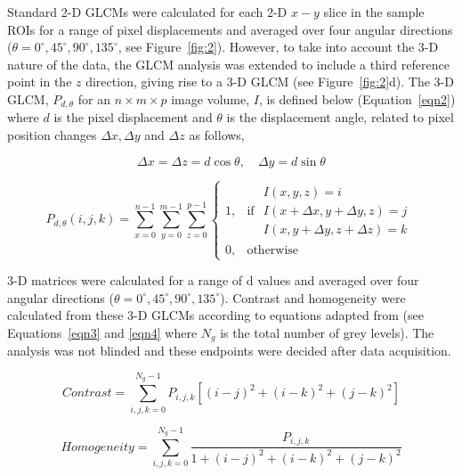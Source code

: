 \documentclass[12pt]{article}
\begin{document}
Standard 2-D GLCMs were calculated for each 2-D $x-y$ slice in the sample ROIs for a range of pixel displacements and averaged over four angular directions ($\theta = 0^{\circ}, 45^{\circ}, 90^{\circ}, 135^{\circ}$, see Figure~\ref{fig:2}). \cite{haralicktextural1973} However, to take into account the 3-D nature of the data, the GLCM analysis was extended to include a third reference point in the $z$ direction, giving rise to a 3-D GLCM (see Figure~\ref{fig:2}d). The 3-D GLCM, $P_{d,\theta}$ for an $n \times m \times p$ image volume, $I$, is defined below (Equation~\ref{eqn2}) where $d$ is the pixel displacement and $\theta$ is the displacement angle, related to pixel position changes $\Delta x, \Delta y$  and $\Delta z$  as follows,   

\begin{equation} \label{eqn1}
\Delta x = \Delta z = d \cos \theta , \quad \Delta y = d \sin \theta
\end{equation}                        

\begin{equation}\label{eqn2}
P_{d,\theta}(i,j,k)= \sum_{x=0}^{n-1} \sum_{y=0}^{m-1} \sum_{z=0}^{p-1} \begin{cases} 1, &\mbox{if } 
\begin{array}{l} 
I(x,y,z)=i \\
I(x+\Delta x,y +\Delta y,z)=j \\
I(x,y+\Delta y,z+\Delta z)=k 
\end{array} \\
0, & \mbox{otherwise}  \end{cases}
\end{equation}

3-D matrices were calculated for a range of d values and averaged over four angular directions ($\theta = 0^{\circ}, 45^{\circ}, 90^{\circ}, 135^{\circ}$). Contrast and homogeneity were calculated from these 3-D GLCMs according to equations adapted from \cite{cheniris2009} (see Equations~\ref{eqn3} and \ref{eqn4} where $N_g$ is the total number of grey levels). The analysis was not blinded and these endpoints were decided after data acquisition.

\begin{equation}\label{eqn3}
Contrast = \sum_{i,j,k=0}^{N_g-1} P_{i,j,k}[(i-j)^2+(i-k)^2+(j-k)^2]
\end{equation}

\begin{equation}\label{eqn4}
Homogeneity = \sum_{i,j,k=0}^{N_g-1} \frac{P_{i,j,k}}{1+(i-j)^2+(i-k)^2+(j-k)^2}
\end{equation}
\end{document}
